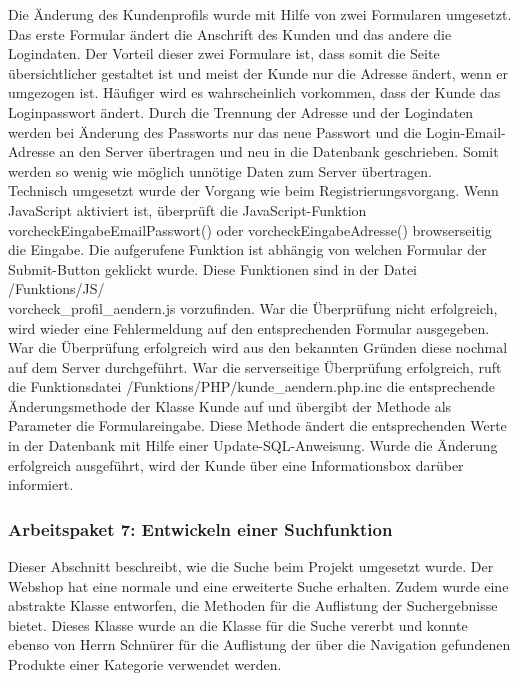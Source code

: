 Die Änderung des Kundenprofils wurde mit Hilfe von zwei Formularen umgesetzt. Das erste Formular ändert die Anschrift des Kunden und das andere die Logindaten. Der Vorteil dieser zwei Formulare ist, dass somit die Seite übersichtlicher gestaltet ist und meist der Kunde  nur die Adresse ändert, wenn er umgezogen ist. Häufiger wird es wahrscheinlich vorkommen, dass der Kunde das Loginpasswort ändert. Durch die Trennung der Adresse und der Logindaten werden bei Änderung des Passworts nur das neue Passwort und die Login-Email-Adresse an den Server übertragen und neu in die Datenbank geschrieben. Somit werden so wenig wie möglich unnötige Daten zum Server übertragen.\\
Technisch umgesetzt wurde der Vorgang wie beim Registrierungsvorgang. Wenn JavaScript aktiviert ist, überprüft die JavaScript-Funktion \glqq vorcheckEingabeEmailPasswort()\grqq{} oder \glqq vorcheckEingabeAdresse()\grqq{} browserseitig die Eingabe. Die aufgerufene Funktion ist abhängig von welchen Formular der Submit-Button geklickt wurde. Diese Funktionen sind in der Datei \glqq /Funktions/JS/ \\ vorcheck\_profil\_aendern.js\grqq{} vorzufinden. War die Überprüfung nicht erfolgreich, wird wieder eine Fehlermeldung auf den entsprechenden Formular ausgegeben. War die Überprüfung erfolgreich wird aus den bekannten Gründen diese nochmal auf dem Server durchgeführt. War die serverseitige Überprüfung erfolgreich, ruft die Funktionsdatei \glqq /Funktions/PHP/kunde\_aendern.php.inc\grqq{} die entsprechende Änderungsmethode der Klasse \glqq Kunde\grqq{} auf und übergibt der Methode als Parameter die Formulareingabe. Diese Methode ändert die entsprechenden Werte in der Datenbank mit Hilfe einer Update-SQL-Anweisung. Wurde die Änderung erfolgreich ausgeführt, wird der Kunde über eine Informationsbox darüber informiert.

\subsubsection{Arbeitspaket 7: Entwickeln einer Suchfunktion}
Dieser Abschnitt beschreibt, wie die Suche beim Projekt umgesetzt wurde. Der Webshop hat eine \glqq normale\grqq{} und eine \glqq erweiterte\grqq{} Suche erhalten. Zudem wurde eine abstrakte Klasse entworfen, die Methoden für die Auflistung der Suchergebnisse bietet. Dieses Klasse wurde an die Klasse für die Suche vererbt und konnte ebenso von Herrn Schnürer für die Auflistung der über die Navigation gefundenen Produkte einer Kategorie verwendet werden.\\

